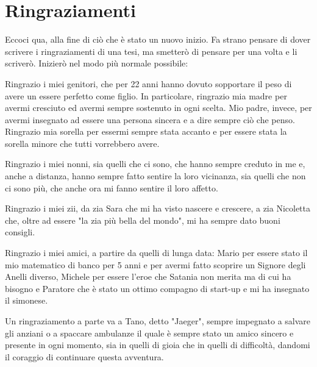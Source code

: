 \chapter*{Ringraziamenti}

Eccoci qua, alla fine di ciò che è stato un nuovo inizio. Fa strano pensare di dover scrivere i ringraziamenti di una tesi, ma smetterò di pensare per una volta e li scriverò.
Inizierò nel modo più normale possibile:

Ringrazio i miei genitori, che per 22 anni hanno dovuto sopportare il peso di avere un essere perfetto come figlio.
In particolare, ringrazio mia madre per avermi cresciuto ed avermi sempre sostenuto in ogni scelta.
Mio padre, invece, per avermi insegnato ad essere una persona sincera e a dire sempre ciò che penso.
Ringrazio mia sorella per essermi sempre stata accanto e per essere stata la sorella minore che tutti vorrebbero avere.

Ringrazio i miei nonni, sia quelli che ci sono, che hanno sempre creduto in me e, anche a distanza, hanno sempre fatto sentire la loro vicinanza,
sia quelli che non ci sono più, che anche ora mi fanno sentire il loro affetto.

Ringrazio i miei zii, da zia Sara che mi ha visto nascere e crescere, a zia Nicoletta che, oltre ad essere "la zia più bella del mondo", mi ha sempre dato buoni consigli.

Ringrazio i miei amici, a partire da quelli di lunga data: Mario per essere stato il mio matematico di banco per 5 anni e per avermi fatto scoprire un Signore degli Anelli diverso,
Michele per essere l'eroe che Satania non merita ma di cui ha bisogno e Paratore che è stato un ottimo compagno di start-up e mi ha insegnato il simonese.

Un ringraziamento a parte va a Tano, detto "Jaeger", sempre impegnato a salvare gli anziani o a spaccare ambulanze il quale è sempre stato un amico sincero e presente in ogni momento, sia in quelli di gioia che in quelli di difficoltà, dandomi il coraggio di continuare questa avventura.

